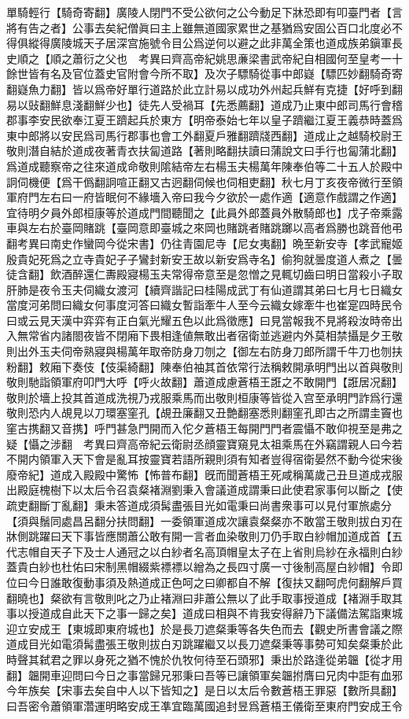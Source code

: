 單騎輕行【騎奇寄翻】廣陵人閉門不受公欲何之公今動足下牀恐即有叩臺門者【言將有告之者】公事去矣紀僧眞曰主上雖無道國家累世之基猶爲安固公百口北度必不得俱縱得廣陵城天子居深宫施號令目公爲逆何以避之此非萬全策也道成族弟鎭軍長史順之【順之蕭衍之父也　考異曰齊高帝紀姚思亷梁書武帝紀自相國何至皇考一十餘世皆有名及官位蓋史官附會今所不取】及次子驃騎從事中郎嶷【驃匹妙翻騎奇寄翻嶷魚力翻】皆以爲帝好單行道路於此立計易以成功外州起兵鮮有克捷【好呼到翻易以䜴翻鮮息淺翻鮮少也】徒先人受禍耳【先悉薦翻】道成乃止東中郎司馬行會稽郡事李安民欲奉江夏王躋起兵於東方【明帝泰始七年以皇子躋繼江夏王義恭時蓋爲東中郎將以安民爲司馬行郡事也會工外翻夏戶雅翻躋牋西翻】道成止之越騎校尉王敬則潛自結於道成夜著青衣扶匐道路【著則略翻扶讀曰蒲說文曰手行也匐蒲北翻】爲道成聽察帝之往來道成命敬則隂結帝左右楊玉夫楊萬年陳奉伯等二十五人於殿中詗伺機便【爲干僞翻詗喧正翻又古迥翻伺候也伺相吏翻】秋七月丁亥夜帝微行至領軍府門左右曰一府皆眠何不緣墻入帝曰我今夕欲於一處作適【適意作戲謂之作適】宜待明夕員外郎桓康等於道成門間聽聞之【此員外郎蓋員外散騎郎也】戊子帝乘露車與左右於臺岡賭跳【臺岡意即臺城之來岡也賭跳者賭跳躑以高者爲勝也跳音他弔翻考異曰南史作蠻岡今從宋書】仍往青園尼寺【尼女夷翻】晩至新安寺【孝武寵姬殷貴妃死爲之立寺貴妃子子鸞封新安王故以新安爲寺名】偷狗就曇度道人煮之【曇徒含翻】飲酒醉還仁夀殿寢楊玉夫常得帝意至是忽憎之見輒切齒曰明日當殺小子取肝肺是夜令玉夫伺織女渡河【續齊諧記曰桂陽成武丁有仙道謂其弟曰七月七日織女當度河弟問曰織女何事度河答曰織女暫詣牽牛人至今云織女嫁牽牛也崔寔四時民令曰或云見天漢中弈弈有正白氣光耀五色以此爲徵應】曰見當報我不見將殺汝時帝出入無常省内諸閤夜皆不閉廂下畏相逢値無敢出者宿衛並逃避内外莫相禁攝是夕王敬則出外玉夫伺帝熟寢與楊萬年取帝防身刀刎之【御左右防身刀郎所謂千牛刀也刎扶粉翻】敕廂下奏伎【伎渠綺翻】陳奉伯袖其首依常行法稱敕開承明門出以首與敬則敬則馳詣領軍府叩門大呼【呼火故翻】蕭道成慮蒼梧王誑之不敢開門【誑居况翻】敬則於墻上投其首道成洗視乃戎服乘馬而出敬則桓康等皆從入宫至承明門詐爲行還敬則恐内人覘見以刀環塞窐孔【覘丑廉翻又丑艶翻塞悉則翻窐孔即古之所謂圭竇也窐古携翻又音携】呼門甚急門開而入佗夕蒼梧王每開門門者震懾不敢仰視至是弗之疑【懾之涉翻　考異曰齊高帝紀云衛尉丞顔靈寶窺見太祖乘馬在外竊謂親人曰今若不開内領軍入天下會是亂耳按靈寶若語所親則須有知者豈得宿衛晏然不動今從宋後廢帝紀】道成入殿殿中驚怖【怖普布翻】旣而聞蒼梧王死咸稱萬歲己丑旦道成戎服出殿庭槐樹下以太后令召袁粲褚淵劉秉入會議道成謂秉曰此使君家事何以斷之【使疏吏翻斷丁亂翻】秉未答道成須髯盡張目光如電秉曰尚書衆事可以見付軍旅處分【須與鬚同處昌呂翻分扶問翻】一委領軍道成次讓袁粲粲亦不敢當王敬則拔白刃在牀側跳躍曰天下事皆應關蕭公敢有開一言者血染敬則刀仍手取白紗帽加道成首【五代志帽自天子下及士人通冠之以白紗者名高頂帽皇太子在上省則烏紗在永福則白紗蓋貴白紗也杜佑曰宋制黑帽綴紫褾褾以繒為之長四寸廣一寸後制高屋白紗帽】令即位曰今日誰敢復動事須及熱道成正色呵之曰卿都自不解【復扶又翻呵虎何翻解戶買翻曉也】粲欲有言敬則叱之乃止褚淵曰非蕭公無以了此手取事授道成【褚淵手取其事以授道成自此天下之事一歸之矣】道成曰相與不肯我安得辭乃下議備法駕詣東城迎立安成王【東城即東府城也】於是長刀遮粲秉等各失色而去【觀史所書會議之際道成目光如電須髯盡張王敬則拔白刃跳躍繼又以長刀遮粲秉等事勢可知矣粲秉於此時聲其弑君之罪以身死之猶不愧於仇牧何待至石頭邪】秉出於路逢從弟韞【從才用翻】韞開車迎問曰今日之事當歸兄邪秉曰吾等已讓領軍矣韞拊膺曰兄肉中詎有血邪今年族矣【宋事去矣自中人以下皆知之】是日以太后令數蒼梧王罪惡【數所具翻】曰吾密令蕭領軍濳運明略安成王凖宜臨萬國追封昱爲蒼梧王儀衛至東府門安成王令